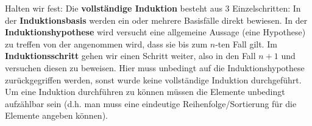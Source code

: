 {\begin{comment}
Wir wollen nun also beweisen: $\tforall i \leq n+1: T_i$.
Laut Induktionshypothese gilt: $\tforall i \leq n: T_i$.
Es bleibt daher nur zu beweisen übrig: $T_{n+1}$.
Dazu versuchen wir nun umzuformen:
\begin{align*}
T_{n+1} \lra T_{n} \tag{laut Aussage $A$}
\end{align*}
$T_n$ gilt laut Induktionshypothese, der Beweis ist damit erbracht: Wir haben bewiesen, dass $\tforall i: T_i$.
Diesen Teil der Induktion nennen wir \textbf{Induktionsschritt}.
Meist ist hier mehr Arbeit erforderlich als bei diesem kleinen Beispiel. Wir werden das auch beim nächsten Beispiel sehen.
\end{bsp}
\ifthenelse{\boolean{long}}{}{\end{comment}}

Halten wir fest: Die \textbf{vollständige Induktion} besteht aus 3 Einzelschritten: In der \textbf{Induktionsbasis} werden ein oder mehrere Basisfälle direkt bewiesen.
In der \textbf{Induktionshypothese} wird versucht eine allgemeine Aussage (eine Hypothese) zu treffen von der angenommen wird, dass sie bis zum $n$-ten Fall gilt.
Im \textbf{Induktionsschritt} gehen wir einen Schritt weiter, also in den Fall $n+1$ und versuchen diesen zu beweisen. Hier muss unbedingt auf die Induktionshypothese zurückgegriffen
werden, sonst wurde keine vollständige Induktion durchgeführt. Um eine Induktion durchführen zu können müssen die Elemente unbedingt aufzählbar sein
(d.h. man muss eine eindeutige Reihenfolge/Sortierung für die Elemente angeben können).

